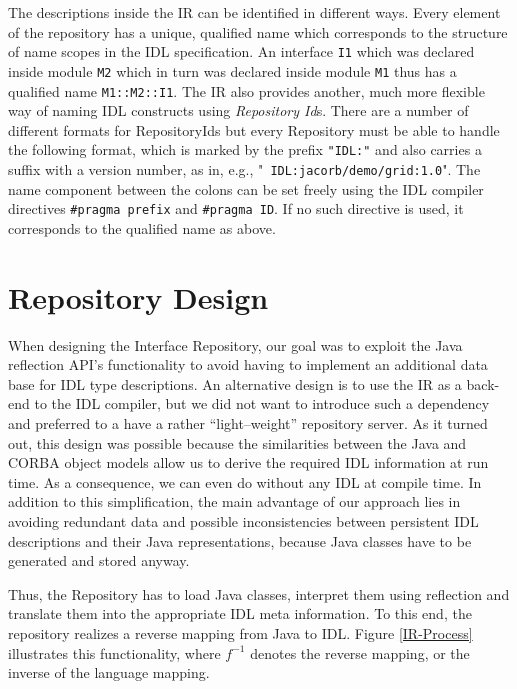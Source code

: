 The  descriptions  inside  the  IR  can  be  identified  in  different
ways. Every  element of  the repository has  a unique,  qualified name
which  corresponds  to  the  structure  of  name  scopes  in  the  IDL
specification. An interface {\tt  I1} which was declared inside module
{\tt M2} which in turn was  declared inside module {\tt M1} thus has a
qualified name  {\tt M1::M2::I1}. The  IR also provides  another, much
more   flexible   way   of    naming   IDL   constructs   using   {\it
Repository Id}s.  There   are  a   number  of  different   formats  for
RepositoryIds  but  every  Repository  must  be  able  to  handle  the
following format, which is marked  by the prefix {\tt "IDL:"} and also
carries  a  suffix   with  a  version  number,  as   in,  e.g.,  "{\tt
IDL:jacorb/demo/grid:1.0}". The name  component between the colons can
be set freely using the  IDL compiler directives {\tt \#pragma prefix}
and {\tt \#pragma ID}. If no such directive is used, it corresponds to
the qualified name as above.

\section{Repository Design}

When designing the  Interface Repository, our goal was  to exploit the
Java reflection  API's functionality to  avoid having to  implement an
additional data base for  IDL type descriptions. An alternative design
is to use the IR as a back-end to the IDL compiler, but we did not want
to  introduce such  a  dependency and  preferred  to a  have a  rather
``light--weight'' repository  server.  As  it turned out,  this design
was  possible because  the similarities  between the  Java  and CORBA
object models allow  us to derive the required  IDL information at run
time. As  a consequence,  we can  even do without  any IDL  at compile
time.  In addition  to this simplification, the main  advantage of our
approach lies in avoiding  redundant data and possible inconsistencies
between  persistent IDL descriptions  and their  Java representations,
because Java classes have to be generated and stored anyway.

Thus, the  Repository has to  load Java classes, interpret  them using
reflection  and   translate  them   into  the  appropriate   IDL  meta
information. To  this end, the  repository realizes a  reverse mapping
from   Java   to  IDL.   Figure   \ref{IR-Process}  illustrates   this
functionality,  where $f^{-1}$  denotes  the reverse  mapping, or  the
inverse of  the language  mapping.

